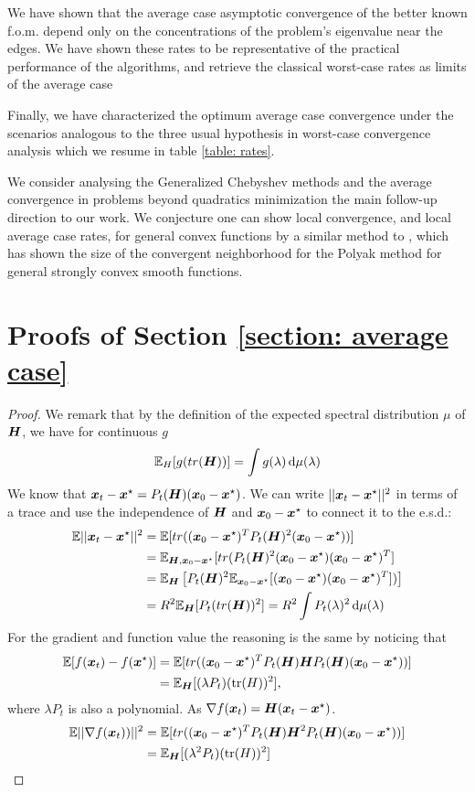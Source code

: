 \documentclass{article}
\begin{document}
We have  shown that the average case asymptotic convergence of  the better known f.o.m. depend only on the concentrations of the problem's eigenvalue near the edges. We have shown these rates to be representative of the practical performance of the algorithms, and retrieve the classical worst-case rates as limits of the average case

Finally, we have characterized the optimum average case convergence under the scenarios analogous to the three usual hypothesis in worst-case convergence analysis which we resume in table \ref{table: rates}.

We consider analysing the Generalized Chebyshev methods and the average convergence in problems beyond quadratics minimization the main follow-up direction to our work. We conjecture one can show local convergence, and local average case rates, for general convex functions by a similar method to \cite{wang2021modular}, which has shown the size of the convergent neighborhood for the Polyak method for general strongly convex smooth functions.
\newpage



\appendix
\newpage
\section{Proofs of Section \ref{section: average case}}
\metrics*
\begin{proof}
\newcommand\xinit{\xx_0-\xx^\star}
We remark that by the definition of the expected spectral distribution $\mu$ of ${\boldsymbol H}$, we have for continuous $g$
\begin{equation}
    {\mathbb{E}}_H[g(tr({\boldsymbol H}))]=\int g(\lambda)\mathop{}\!\mathrm{d} \mu(\lambda) 
\end{equation}
We know that $\xx_t-\xx^\star=P_t(\HH)(\xinit)$. We can write $||{\boldsymbol x}_t-{\boldsymbol x}^\star||^2$ in terms of a trace and use the independence of ${\boldsymbol H}$ and $\xinit$ to connect it to the e.s.d.:
\begin{align}
    \mathbb{E}||\xx_t-\xx^\star||^2&=\EE[ tr((\xinit)^TP_t(\HH)^2(\xinit))] \\
    &=\EE_{\HH,\xinit} [tr(P_t(\HH)^2(\xinit)(\xinit)^T]\\
    &=\EE_\HH\left[P_t(\HH)^2\EE_{\xinit}[(\xinit)(\xinit)^T])\right]  \\
    &=R^2\EE_\HH[P_t(tr(\HH))^2]=R^2 \int P_t(\lambda)^2\dif\mu(\lambda)
\end{align}
For the gradient and function value the reasoning is the same by noticing that
\begin{align}
    \EE[f(\xx_t)-f(\xx^\star)]&=\EE[ tr((\xinit)^TP_t(\HH)\HH P_t(\HH)(\xinit))]\\
    &=\EE_\HH[(\lambda P_t)(\tr(H))^2],
\end{align}
where $\lambda P_t$ is also a  polynomial. As $\nabla f({\boldsymbol x}_t)={\boldsymbol H}({\boldsymbol x}_t-{\boldsymbol x}^\star)$.
\begin{align}
    \EE||\nabla f(\xx_t))||^2&=\EE[ tr((\xinit)^TP_t(\HH)\HH^2 P_t(\HH)(\xinit))]\\
    &=\EE_\HH[(\lambda^2 P_t)(\tr(H))^2]
\end{align}


\end{proof}
\end{document}
